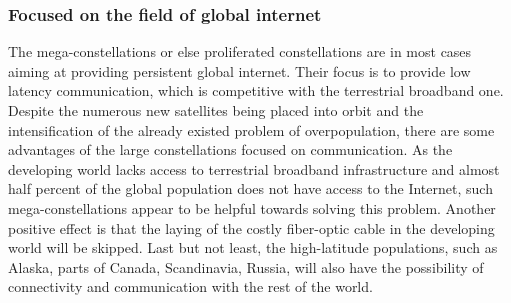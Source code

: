 \subsubsection{Focused on the field of global internet}
\bigskip
The mega-constellations or else proliferated constellations are in most cases aiming at providing persistent global internet. Their focus is to provide low latency communication, which is competitive with the terrestrial broadband one. Despite the numerous new satellites being placed into orbit and the intensification of the already existed problem of overpopulation, there are some advantages of the large constellations focused on communication. As the developing world lacks access to terrestrial broadband infrastructure and almost half percent of the global population does not have access to the Internet, such mega-constellations appear to be helpful towards solving this problem. Another positive effect is that the laying of the costly fiber-optic cable in the developing world will be skipped. Last but not least, the high-latitude populations, such as Alaska, parts of Canada, Scandinavia, Russia, will also have the possibility of connectivity and communication with the rest of the world. \cite{Hallex}

\bigskip
